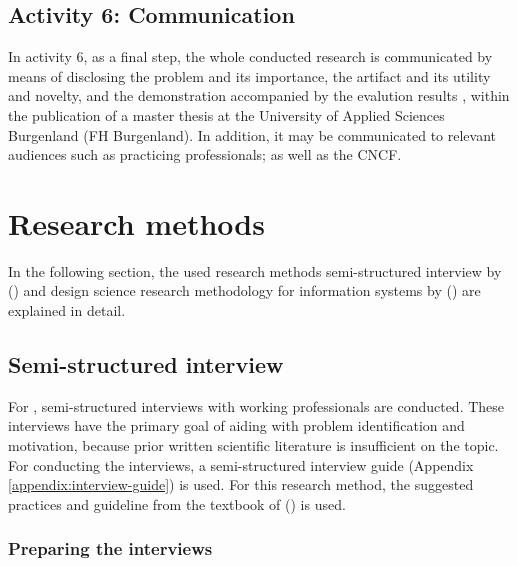 \subsection{Activity 6: Communication}
\label{methodology:activity6}

\noindent
In activity 6, as a final step,
the whole conducted research is communicated by means of
disclosing
the problem and its importance,
the artifact and its utility and novelty,
and the demonstration accompanied by the evalution results
\autocite{designScienceResearchMethodologyForInformationSystemsResearch},
within the publication of a master thesis at
the University of Applied Sciences Burgenland (FH Burgenland).
In addition, it may be communicated to relevant audiences such as practicing professionals;
as well as the CNCF.


\section{Research methods}

In the following section,
the used research methods
semi-structured interview
by
\citeauthor{glaser2010experteninterviews} (\citeyear{glaser2010experteninterviews})
and
design science research methodology for information systems
by
\citeauthor{designScienceResearchMethodologyForInformationSystemsResearch} (\citeyear{designScienceResearchMethodologyForInformationSystemsResearch})
are explained in detail.

\subsection{Semi-structured interview}


For ,
semi-structured interviews with working professionals
are conducted.
These interviews have the primary goal of aiding with
problem identification and motivation,
because prior written scientific literature is insufficient on the topic.
For conducting the interviews,
a semi-structured interview guide (Appendix \ref{appendix:interview-guide}) is used.
For this research method,
the suggested practices and guideline from
the textbook of
\citeauthor{glaser2010experteninterviews} (\citeyear{glaser2010experteninterviews})
is used.

\subsubsection{Preparing the interviews}

